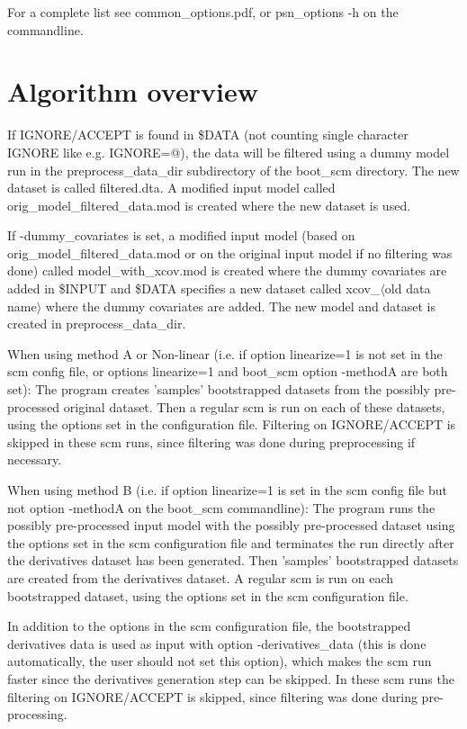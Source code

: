 For a complete list see common\_options.pdf, or psn\_options -h on the commandline.

\begin{optionlist}

\end{optionlist}

\section{Algorithm overview}

If IGNORE/ACCEPT is found in \$DATA (not counting single character IGNORE like e.g. IGNORE=@), 
the data will be filtered using a dummy model run in the preprocess\_data\_dir subdirectory of the boot\_scm directory. The new dataset is called filtered.dta. 
A modified input model called orig\_model\_filtered\_data.mod is created where the new dataset is used.

If -dummy\_covariates is set, a modified input model (based on orig\_model\_filtered\_data.mod or on the original input model if no filtering was done) called model\_with\_xcov.mod is created where the dummy covariates are added in \$INPUT and \$DATA specifies a new dataset called xcov\_$\langle$old data name$\rangle$ where the dummy covariates are added. The new model and dataset is created in preprocess\_data\_dir. 

When using method A or Non-linear (i.e. if option linearize=1 is not set in the scm config file, 
or options linearize=1 and boot\_scm option -methodA are both set): The program creates 'samples' bootstrapped datasets from the possibly pre-processed original dataset. 
Then a regular scm is run on each of these datasets, using the options set in the configuration file. Filtering on IGNORE/ACCEPT is skipped in these scm runs, since filtering was done during preprocessing if necessary. 

When using method B (i.e. if option linearize=1 is set in the scm config file but not option -methodA on the boot\_scm commandline): 
The program runs the possibly pre-processed input model with the possibly pre-processed dataset using the options set in the scm configuration 
file and terminates the run directly after the derivatives dataset has been generated. Then 'samples' bootstrapped datasets are created from the 
derivatives dataset. 
A regular scm is run on each bootstrapped dataset, using the options set in the scm configuration file. 

In addition to the options in the scm configuration file, 
the bootstrapped derivatives data is used as input with option -derivatives\_data (this is done automatically, the user should not set this option), 
which makes the scm run faster since the derivatives generation step can be skipped. In these scm runs the filtering on IGNORE/ACCEPT is skipped, 
since filtering was done during pre-processing. 


